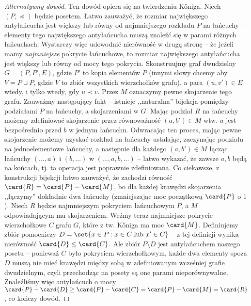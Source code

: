 \begin{proof}[Alternatywny dowód]
	Ten dowód opiera się na twierdzeniu K\H{o}niga. Niech \((P, \preceq)\) będzie posetem. Łatwo zauważyć, że rozmiar największego antyłańcucha jest
	większy lub równy od najmniejszego rozkładu $P$ na łańcuchy -- elementy tego największego antyłańcucha muszą znaleźć się w parami różnych łańcuchach.
	Wystarczy więc udowodnić nierówność w drugą stronę -- że jeżeli mamy \textit{najmniejsze} pokrycie łańcuchowe, to rozmiar największego antyłańcucha jest
	większy lub równy od mocy tego pokrycia.
	Skonstruujmy graf dwudzielny $G = (P, P', E)$, gdzie $P'$ to kopia elementów $P$ (innymi słowy chcemy aby $V = P \sqcup P$, gdzie $V$ to zbiór wszystkich wierzchołków grafu),
	a para $(u, v') \in E$ wtedy, i tylko wtedy, gdy $u \prec v$. Przez $M$ oznaczymy pewne skojarzenie tego grafu. Zauważmy następujący fakt --
	istnieje ,,naturalna'' bijekcja pomiędzy podziałami $P$ na łańcuchy, a skojarzeniami w $G$. Mając podział $R$ na łańcuchy możemy zdefiniować skojarzenie
	przez równoważność $(a, b') \in M$ wtw. $a$ jest bezpośrednio przed $b$ w jednym łańcuchu. Odwracając ten proces, mając pewne skojarzenie
	możemy uzyskać rozkład na łańcuchy ustalając, zaczynając podziału na jednoelementowe łańcuchy, a następnie dla każdego $(a, b') \in M$
	łącząc łańcuchy $(\ldots, a)$ i $(b, \ldots)$ w $(\ldots, a, b, \ldots)$ -- łatwo wykazać, że zawsze $a, b$ będą na końcach, tj. ta operacja jest poprawnie zdefiniowana.
	Co ciekawsze, z konstrukcji bijekcji łatwo zauważyć, że zachodzi równość $\card{R} = \card{P} - \card{M}$, bo dla każdej krawędzi skojarzenia ,,łączymy'' dokładnie dwa łańcuchy (zmniejszając moc początkową $\card{P}$ o $1$).
	Niech $R$ będzie najmniejszym pokryciem łańcuchowym $P$, a $M$ odpowiadającym mu skojarzeniem. Weźmy teraz najmniejsze pokrycie wierzchołkowe $C$ grafu $G$, które z tw. K\H{o}niga ma moc $\card{M}$.
	Definiujemy zbiór pomocniczy $D = \set{x \in P : x \in C \text{ lub } x' \in C}$ -- z tej definicji wynika nierówność $\card{D} \leq \card{C}$.
	Ale zbiór $P \setminus D$ jest antyłańcuchem naszego posetu -- ponieważ $C$ było pokryciem wierzchołkowym, każde dwa elementy spoza $D$ muszą
	nie mieć krawędzi między sobą w zdefiniowanym wcześniej grafie dwudzielnym, czyli przechodząc na posety są one parami nieporównywalne.
	Znaleźliśmy więc antyłańcuch o mocy $\card{P} - \card{D} \geq \card{P} - \card{C} = \card{P} - \card{M} = \card{R}$, co kończy dowód.
\end{proof}

